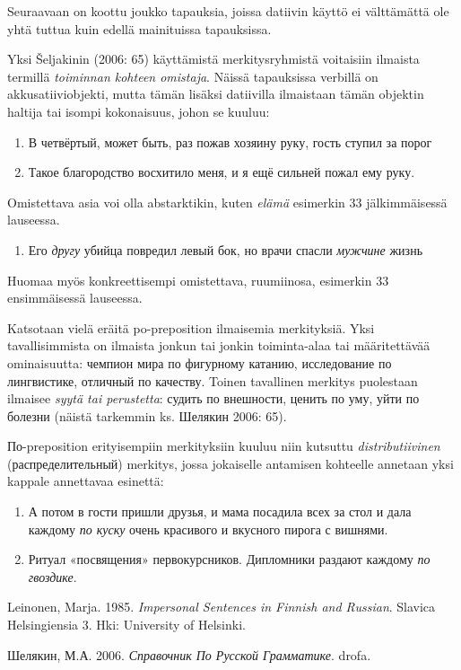 \documentclass[]{scrartcl}
\providecommand{\tightlist}{%
  \setlength{\itemsep}{0pt}\setlength{\parskip}{0pt}}
\begin{document}
Seuraavaan on koottu joukko tapauksia, joissa datiivin käyttö ei
välttämättä ole yhtä tuttua kuin edellä mainituissa tapauksissa.

Yksi Šeljakinin (2006: 65) käyttämistä merkitysryhmistä voitaisiin
ilmaista termillä \emph{toiminnan kohteen omistaja}. Näissä tapauksissa
verbillä on akkusatiiviobjekti, mutta tämän lisäksi datiivilla
ilmaistaan tämän objektin haltija tai isompi kokonaisuus, johon se
kuuluu:

\begin{enumerate}
\def\labelenumi{(\arabic{enumi})}
\setcounter{enumi}{30}
\tightlist
\item
  В четвёртый, может быть, раз пожав хозяину руку, гость ступил за порог
\item
  Такое благородство восхитило меня, и я ещё сильней пожал ему руку.
\end{enumerate}

Omistettava asia voi olla abstarktikin, kuten \emph{elämä} esimerkin 33
jälkimmäisessä lauseessa.

\begin{enumerate}
\def\labelenumi{(\arabic{enumi})}
\setcounter{enumi}{32}
\tightlist
\item
  Его \emph{другу} убийца повредил левый бок, но врачи спасли
  \emph{мужчине} жизнь
\end{enumerate}

Huomaa myös konkreettisempi omistettava, ruumiinosa, esimerkin 33
ensimmäisessä lauseessa.

Katsotaan vielä eräitä po-preposition ilmaisemia merkityksiä. Yksi
tavallisimmista on ilmaista jonkun tai jonkin toiminta-alaa tai
määritettävää ominaisuutta: чемпион мира по фигурному катанию,
исследование по лингвистике, отличный по качеству. Toinen tavallinen
merkitys puolestaan ilmaisee \emph{syytä tai perustetta}: судить по
внешности, ценить по уму, уйти по болезни (näistä tarkemmin ks. Шелякин
2006: 65).

По-preposition erityisempiin merkityksiin kuuluu niin kutsuttu
\emph{distributiivinen} (распределительный) merkitys, jossa jokaiselle
antamisen kohteelle annetaan yksi kappale annettavaa esinettä:

\begin{enumerate}
\def\labelenumi{(\arabic{enumi})}
\setcounter{enumi}{33}
\tightlist
\item
  А потом в гости пришли друзья, и мама посадила всех за стол и дала
  каждому \emph{по куску} очень красивого и вкусного пирога с вишнями.
\item
  Ритуал «посвящения» первокурсников. Дипломники раздают каждому
  \emph{по гвоздике}.
\end{enumerate}

Leinonen, Marja. 1985. \emph{Impersonal Sentences in Finnish and
Russian}. Slavica Helsingiensia 3. Hki: University of Helsinki.

Шелякин, М.А. 2006. \emph{Справочник По Русской Грамматике}. drofa.
\end{document}
